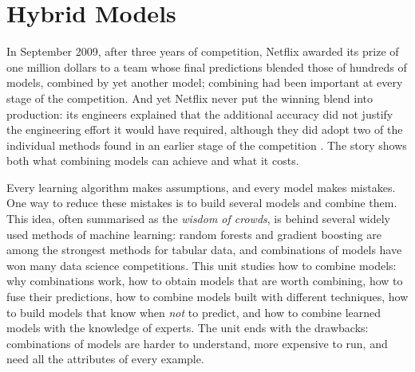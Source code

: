 \chapter{Hybrid Models}\label{ch:hybrid}

In September 2009, after three years of competition, Netflix awarded its prize of one million dollars to a team
whose final predictions blended those of hundreds of models, combined by yet another model; combining had been important at every stage of the competition. And yet Netflix never put the winning blend into production: its engineers
explained that the additional accuracy did not justify the engineering effort it would have required, although they
did adopt two of the individual methods found in an earlier stage of the competition \citep{amatriain2012netflix}.
The story shows both what combining models can achieve and what it costs.

Every learning algorithm makes assumptions, and every model makes mistakes. One way to reduce these mistakes is to build several models and combine them. This idea, often summarised as the \emph{wisdom of crowds}, is behind several widely used methods of machine learning: random forests and gradient boosting are among the strongest methods for tabular data,
and combinations of models have won many data science competitions. This unit studies how to
combine models: why combinations work, how to obtain models that are worth combining, how
to fuse their predictions, how to combine models built with different techniques, how
to build models that know when \emph{not} to predict, and how to combine learned models with the knowledge of experts. The unit ends with the drawbacks:
combinations of models are harder to understand, more expensive to run, and need all the
attributes of every example.

